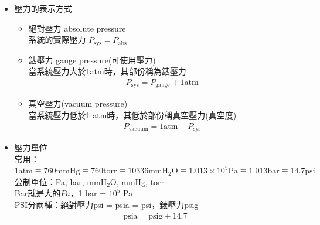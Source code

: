 \documentclass[../main.tex]{subfiles}
\begin{document}
\begin{itemize}
\begin{equation}
  \end{equation}
  而為了求解，還需要多假設，兩側流體$\rho_A$有相同質量$m_A$\\
  並且知道大槽表面積為$A$，細管表面積為$a$\\
  而扣除掉左右兩邊共通的$d_2$段後\\
  左邊多餘的重量為$\rho_A\frac{g}{g_c}aR$，右邊多餘的重量為$\rho_A\frac{g}{g_c}Ah$\\
  兩者須相等
  \begin{equation}
    \rho_A\frac{g}{g_c}aR = \rho_A\frac{g}{g_c}Ah
  \end{equation}
  整理後可得
  \begin{equation}
    h = \frac{a}{A}R
  \end{equation}
  將$h$代入壓差方程式(\ref{eq:ch1_manometer_balance})中
  \begin{equation}
    P_A - P_B = \left(\rho_C - \rho_A\right)\frac{g}{g_c}R - \left(\rho_B - \rho_A\right)\frac{g}{g_c}\frac{a}{A}R
  \end{equation}
  \item 壓力的表示方式
  \begin{itemize}
    \item 絕對壓力 absolute pressure\\
    系統的實際壓力 $P_{\textrm{sys}}=P_{\textrm{abs}}$
    \item 錶壓力 gauge pressure(可使用壓力)\\
    當系統壓力大於1atm時，其部份稱為錶壓力
    \begin{align}
      P_{\textrm{sys}} = P_{\textrm{gauge}}+ 1 \textrm{atm}
    \end{align}
    \item 真空壓力(vacuum pressure)\\
    當系統壓力低於1 atm時，其低於部份稱真空壓力(真空度)
    \begin{align}
      P_{\textrm{vacuum}}= 1 \textrm{atm} - P_\textrm{sys}
    \end{align}
  \end{itemize}
  \item  壓力單位\\
  常用： $1 \textrm{atm} \equiv 760\textrm{mmHg} \equiv 760 \textrm{torr}\equiv 10336 \textrm{mmH}_2\textrm{O}\equiv 1.013\times 10^5 \textrm{Pa}\equiv 1.013 \textrm{bar}\equiv 14.7 \textrm{psi}$\\
  公制單位：Pa, bar, mmH$_2$O, mmHg, torr\\
  Bar就是大的$Pa$，1 bar = $10^5$ Pa\\
  PSI分兩種：絕對壓力psi = psia = psi，錶壓力psig
  \begin{align}
    \textrm{psia} = \textrm{psig}+14.7
  \end{align}
\end{itemize}
\end{document}
